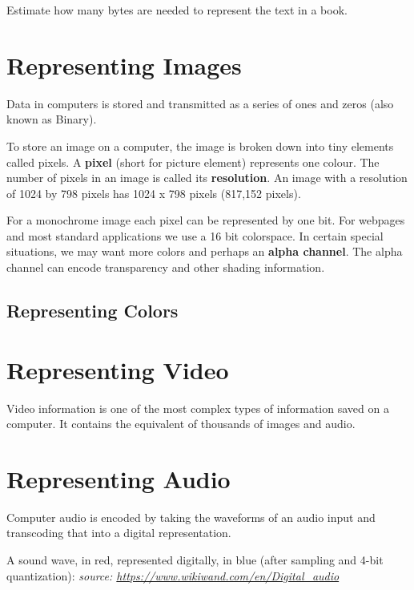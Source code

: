 \documentclass[11pt,a4paper]{report}
\newcommand{\bfb}[1]{{\bf \color{blue} #1}}
\begin{document}
\begin{ex}
Estimate how many bytes are needed to represent the text in a book.
\end{ex}

\newpage

\section{Representing Images}

Data in computers is stored and transmitted as a series of ones and zeros (also known as Binary). 

To store an image on a computer, the image is broken down into tiny elements called pixels. A \bfb{pixel} (short for picture element) represents one colour. The number of pixels in an image is called its \bfb{resolution}. An image with a resolution of 1024 by 798 pixels has 1024 x 798 pixels (817,152 pixels). 

For a monochrome image each pixel can be represented by one bit. For webpages and most standard applications we use a 16 bit colorspace. In  certain special situations, we may want more colors and perhaps an \bfb{alpha channel}. The alpha channel can encode transparency and other shading information.

\subsection{Representing Colors}




\section{Representing Video}

Video information is one of the most complex types of information saved on a computer. It contains the equivalent of thousands of images and audio. 


\section{Representing Audio}

Computer audio is encoded by taking the waveforms of an audio input and transcoding that into a digital representation. 

A sound wave, in red, represented digitally, in blue (after sampling and 4-bit quantization):
\hfill \emph{source: \url{https://www.wikiwand.com/en/Digital_audio}}
\end{document}
